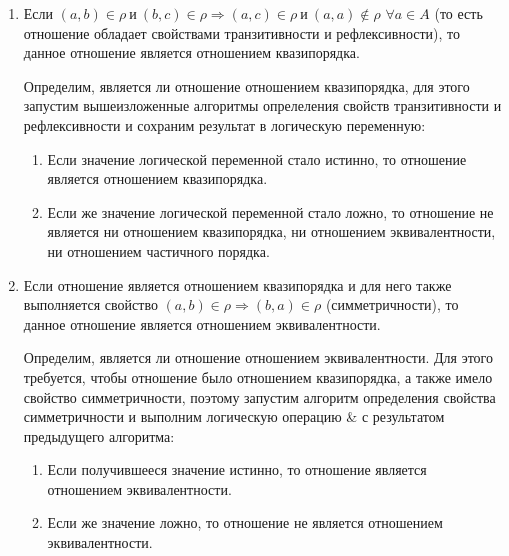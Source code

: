 \documentclass[bachelor, och, labwork]{shiza}
\begin{document}
\begin{enumerate}

    \item Если $(a,b)\in\rho ~\text{и}~ (b,c)\in\rho\Rightarrow (a,c) \in\rho 
    ~\text{и}~ (a,a) \not\in\rho$ $\forall a \in A$ (то есть отношение обладает
    свойствами транзитивности и рефлексивности), то данное отношение является
    отношением квазипорядка.
    
    Определим, является ли отношение отношением квазипорядка, для этого
    запустим вышеизложенные алгоритмы опрелеления свойств транзитивности и
    рефлексивности и сохраним результат в логическую переменную:
    
    \begin{enumerate}
    
        \item Если значение логической переменной стало истинно, то отношение
        является отношением квазипорядка.
       
        \item Если же значение логической переменной стало ложно, то отношение 
        не является ни отношением квазипорядка, ни отношением эквивалентности, 
        ни отношением частичного порядка.
    
    \end{enumerate}
    
    \item Если отношение является отношением квазипорядка и для него также
    выполняется свойство $(a,b) \in\rho\Rightarrow (b,a) \in\rho$ 
    (симметричности), то данное отношение является отношением эквивалентности.
    
    Определим, является ли отношение отношением эквивалентности. Для этого
    требуется, чтобы отношение было отношением квазипорядка, а также имело
    свойство симметричности, поэтому запустим алгоритм определения свойства
    симметричности и выполним логическую операцию \& с результатом предыдущего
    алгоритма:
    
    \begin{enumerate}
    
        \item Если получившееся значение истинно, то отношение является
        отношением эквивалентности.
    
        \item Если же значение ложно, то отношение не является отношением
        эквивалентности. 
    
    \end{enumerate}
    

\end{enumerate}
\end{document}
